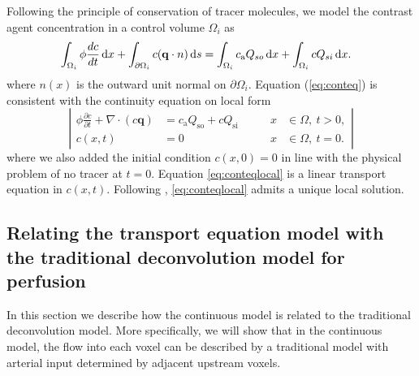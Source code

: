\documentclass[journal,twocolumn]{IEEEtran}
\newcommand{\Qso}{Q_{\mathrm{so}}}
\newcommand{\Qsi}{Q_{\mathrm{si}}}
\newcommand{\ca}{c_\mathrm{a}}
\newcommand{\vq}{\mathbf{q}}
\begin{document}
	Following the principle of conservation of tracer molecules, we model the contrast agent concentration in a control volume $\Omega_i$ as
	\begin{align}
		& \int_{\Omega_i} \phi \frac{d c}{dt} \diffint x + \int_{ \partial \Omega_i}c(\vq \cdot n) \diffint s
		 = \int_{\Omega_i}\ca Q_{so} \diffint x + \int_{\Omega_i}c Q_{si} \diffint x.
		\label{eq:conteq}
	\end{align}
	where $n(x)$ is the outward unit normal on $\partial \Omega_i$.
	Equation (\ref{eq:conteq}) is consistent with the continuity equation on local form
	\begin{equation}
		\left\vert
		\begin{alignedat}{2}
			\phi \frac{\partial c}{\partial t} + \nabla \cdot (c\vq) &= \ca\Qso + c\Qsi \qquad	&x &\in \Omega, \ t>0,  \\
			c(x,t) &= 0 																			 	&x &\in \Omega, \ t=0.
		\end{alignedat}
		\right\vert
		\label{eq:conteqlocal}
	\end{equation}
	where we also added the initial condition $c(x,0) = 0$ in line with the physical problem of no tracer at $t = 0$.
	Equation \eqref{eq:conteqlocal} is a linear transport equation in $c(x,t)$. 
	Following \cite{evans98}, \eqref{eq:conteqlocal} admits a unique local solution.


\subsection{Relating the transport equation model with the traditional deconvolution model for perfusion}\label{sec:NewAndOld}
	In this section we describe how the continuous model is related to the traditional deconvolution model.
	More specifically, we will show that in the continuous model, the flow into each voxel can be described by a traditional model with arterial input determined by adjacent upstream voxels.
\end{document}
